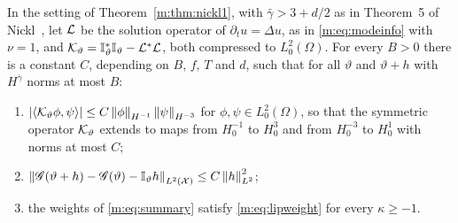 \begin{lemma}\label{m:lem:rdinfo}
In the setting of Theorem~\ref{m:thm:nickl1}, with $\bar\gamma>3+d/2$ as in Theorem~5 of Nickl~\cite{nicklbvm2024}, let $\mathcal{L}$ be the solution operator of $\partial_tu=\Delta u$, as in \eqref{m:eq:modeinfo} with $\nu=1$, and $\mathcal{K}_\vartheta=\mathbb{I}^*_\vartheta\mathbb{I}_\vartheta-\mathcal{L}^*\mathcal{L}$, both compressed to $L^2_0(\Omega)$. For every $B>0$ there is a constant $C$, depending on $B$, $f$, $T$ and $d$, such that for all $\vartheta$ and $\vartheta+h$ with $H^{\bar\gamma}$ norms at most $B$:
\begin{enumerate}[label=(\roman*),nosep]
\item $|\langle\mathcal{K}_\vartheta\phi,\psi\rangle|\le C\left\|\phi\right\|_{H^{-1}}\left\|\psi\right\|_{H^{-3}}$ for $\phi,\psi\in L^2_0(\Omega)$, so that the symmetric operator $\mathcal{K}_\vartheta$ extends to maps from $H^{-1}_0$ to $H^3_0$ and from $H^{-3}_0$ to $H^1_0$ with norms at most $C$;
\item $\left\|\mathscr{G}(\vartheta+h)-\mathscr{G}(\vartheta)-\mathbb{I}_\vartheta h\right\|_{L^2(\mathcal X)}\le C\left\|h\right\|^2_{L^2}$;
\item the weights of \eqref{m:eq:summary} satisfy \eqref{m:eq:lipweight} for every $\kappa\ge-1$.
\end{enumerate}
\end{lemma}

